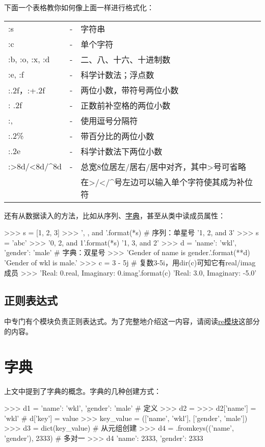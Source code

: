 \documentclass[a4paper,12pt]{report}
\newcommand{\python}{{\ttfamily{Python}}}
\begin{document}
下面一个表格教你如何像上面一样进行格式化：
\begin{center}
\begin{tabular}{lll}
\hline\hline
:s & - & 字符串 \\
:c & - & 单个字符 \\
:b, :o, :x, :d & - & 二、八、十六、十进制数 \\
:e, :f & - & 科学计数法；浮点数 \\
\hline
:.2f，:+.2f & - & 两位小数，带符号两位小数 \\
: .2f & - & 正数前补空格的两位小数 \\
:, & - & 使用逗号分隔符 \\
:.2\% & - & 带百分比的两位小数 \\
:.2e & - & 科学计数法下两位小数 \\
:>8d/<8d/\^{}8d & - & 总宽8位居左/居右/居中对齐，其中>号可省略\\
				&   & 在>/</\^{}号左边可以输入单个字符使其成为补位符 \\
\hline\hline
\end{tabular}
\end{center}

还有从数据读入的方法，比如从序列、\hyperref[subsec:dict]{字典}，甚至从类中读成员属性：\label{strformat-dict}
\begin{py}
>>> s = [1, 2, 3]
>>> '{}, {}, and {}'.format(*s)	# 序列：单星号
'1, 2, and 3'
>>> s = 'abc'
>>> '{0}, {2}, and {1}'.format(*s)
'1, 3, and 2'
>>> d = {'name': 'wkl', 'gender': 'male'} # 字典：双星号
>>> 'Gender of {name} is {gender}.'.format(**d)
'Gender of wkl is male.'
>>> c = 3 - 5j	# 复数3-5i，用dir(c)可知它有real/imag成员
>>> 'Real: {0.real}, Imaginary: {0.imag}'.format(c)
'Real: 3.0, Imaginary: -5.0'
\end{py}

\subsection{正则表达式}
\python 中专门有个模块负责正则表达式。为了完整地介绍这一内容，请阅读\hyperref[sec:re]{re模块}这部分的内容。

\section{字典}
\label{subsec:dict}

上文中提到了字典的概念。字典的几种创建方式：
\begin{py}
>>> d1 = {'name': 'wkl', 'gender': 'male'} # 定义
>>> d2 = {}
>>> d2['name'] = 'wkl'	# d['key'] = value
>>> key_value = (['name', 'wkl'], ['gender', 'male'])
>>> d3 = dict(key_value)	# 从元组创建
>>> d4 = {}.fromkeys(('name', 'gender'), 2333) # 多对一
>>> d4
{'name': 2333, 'gender': 2333}
\end{py}
\end{document}
